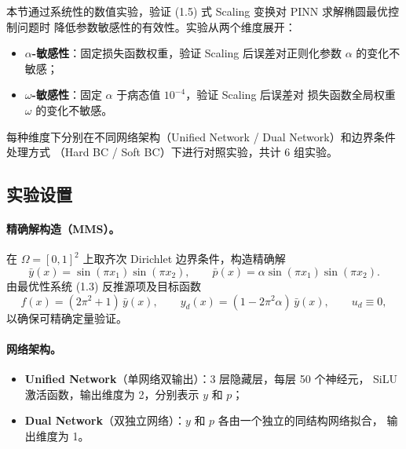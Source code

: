 
本节通过系统性的数值实验，验证 (1.5) 式 Scaling 变换对 PINN 求解椭圆最优控制问题时
降低参数敏感性的有效性。实验从两个维度展开：
\begin{itemize}
  \item \textbf{$\alpha$-敏感性}：固定损失函数权重，验证 Scaling 后误差对正则化参数
        $\alpha$ 的变化不敏感；
  \item \textbf{$\omega$-敏感性}：固定 $\alpha$ 于病态值 $10^{-4}$，验证 Scaling 后误差对
        损失函数全局权重 $\omega$ 的变化不敏感。
\end{itemize}
每种维度下分别在不同网络架构（Unified Network / Dual Network）和边界条件处理方式
（Hard BC / Soft BC）下进行对照实验，共计 6 组实验。


\subsection{实验设置}
\label{subsec:exp-setup}

\paragraph{精确解构造（MMS）。}
在 $\Omega = [0,1]^2$ 上取齐次 Dirichlet 边界条件，构造精确解
\[
  \bar{y}(x) = \sin(\pi x_1)\sin(\pi x_2), \qquad
  \bar{p}(x) = \alpha\sin(\pi x_1)\sin(\pi x_2).
\]
由最优性系统 (1.3) 反推源项及目标函数
\[
  f(x) = (2\pi^2 + 1)\,\bar{y}(x), \qquad
  y_d(x) = (1 - 2\pi^2\alpha)\,\bar{y}(x), \qquad
  u_d \equiv 0,
\]
以确保可精确定量验证。

\paragraph{网络架构。}
\begin{itemize}
  \item \textbf{Unified Network}（单网络双输出）：3 层隐藏层，每层 50 个神经元，
        SiLU 激活函数，输出维度为 2，分别表示 $y$ 和 $p$；
  \item \textbf{Dual Network}（双独立网络）：$y$ 和 $p$ 各由一个独立的同结构网络拟合，
        输出维度为 1。
\end{itemize}

